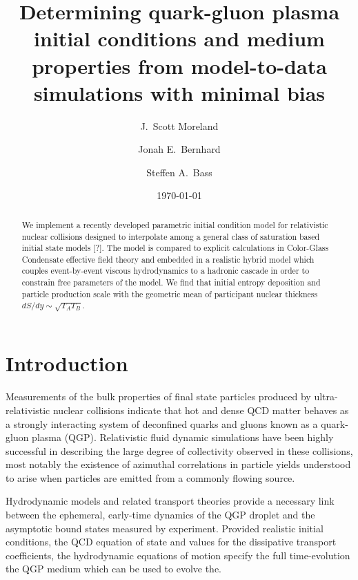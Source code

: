 \documentclass[aps,prc,reprint,amsmath]{revtex4-1}
\begin{document}
\title{Determining quark-gluon plasma initial conditions and medium \\ properties from model-to-data simulations with minimal bias}

\author{J.\ Scott Moreland}
\author{Jonah E.\ Bernhard}
\author{Steffen A.\ Bass}

\date{\today}


\begin{abstract}
  We implement a recently developed parametric initial condition model for relativistic nuclear collisions designed to interpolate among a general class of saturation based initial state models [?]. The model is compared to explicit calculations in Color-Glass Condensate effective field theory and embedded in a realistic hybrid model which couples event-by-event viscous hydrodynamics to a hadronic cascade in order to constrain free parameters of the model. We find that initial entropy deposition and particle production scale with the geometric mean of participant nuclear thickness $dS/dy \sim \sqrt{T_A T_B}$. 
\end{abstract}


\maketitle


\section{Introduction}

Measurements of the bulk properties of final state particles produced by ultra-relativistic nuclear collisions indicate that hot and dense QCD matter behaves as a 
strongly interacting system of deconfined quarks and gluons known as a quark-gluon plasma (QGP). Relativistic fluid dynamic simulations have been highly successful
in describing the large degree of collectivity observed in these collisions, most notably the existence of azimuthal correlations in particle yields understood to arise
when particles are emitted from a commonly flowing source.

Hydrodynamic models and related transport theories provide a necessary link between the ephemeral, early-time dynamics of the QGP droplet and the asymptotic 
bound states measured by experiment. Provided realistic initial conditions, the QCD equation of state and values for the dissipative transport coefficients, the hydrodynamic equations of motion specify the full time-evolution the QGP medium which can be used to evolve the.
\end{document}
